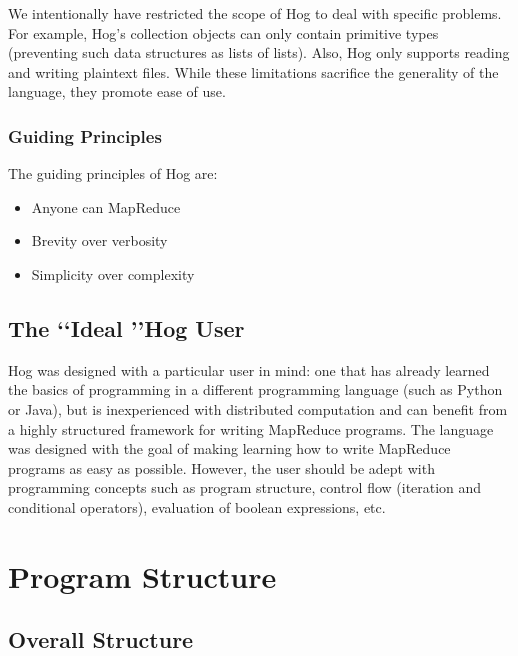 \documentclass{article}
\begin{document}
We intentionally have restricted the scope of Hog to deal with specific problems.
For example, Hog's collection objects can only contain primitive types (preventing
such data structures as lists of lists). Also, Hog only supports reading and
writing plaintext files. While these limitations sacrifice the generality of the
language, they promote ease of use.

\subsubsection{Guiding Principles} %
\label{ssub:guiding_principles}

The guiding principles of Hog are:

\begin{itemize}
  \item Anyone can MapReduce
  \item Brevity over verbosity
  \item Simplicity over complexity
\end{itemize}



\subsection{The \lq\lq Ideal \rq\rq Hog User} %
\label{sub:the_ideal_hog_user}

Hog was designed with a particular user in mind: one that has already learned the basics of programming in a different
programming language (such as Python or Java), but is inexperienced with distributed computation and can benefit from a highly structured framework for writing MapReduce programs. The language was designed with the goal of making learning how to write MapReduce programs as easy as possible. However, the user should be adept with programming concepts such as program structure, control flow (iteration and conditional operators), evaluation of boolean expressions, etc.


\section{Program Structure} %
\label{sec:program_structure}

\subsection{Overall Structure} %
\label{sub:overall_structure}
\end{document}
